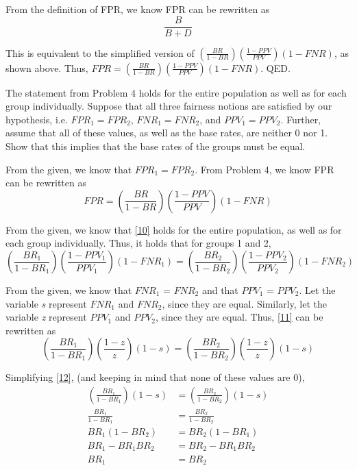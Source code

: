 \documentclass{cisXXX} %
\begin{document}
From the definition of FPR, we know FPR can be rewritten as
$$\frac{B}{B+D}$$

This is equivalent to the simplified version of $(\frac{BR}{1-BR})(\frac{1-PPV}{PPV})(1 -FNR)$, as shown above. Thus, $FPR = (\frac{BR}{1-BR})(\frac{1-PPV}{PPV})(1 -FNR)$. QED.

\HWproblem
The statement from Problem 4 holds for the entire population as well as for each group individually. Suppose that all three fairness notions are satisfied by our hypothesis, i.e. $FPR_1 = FPR_2$, $FNR_1 = FNR_2$, and $PPV_1 = PPV_2$. Further, assume that all of these values, as well as the base rates, are neither 0 nor 1. Show that this implies that the base rates of the groups must be equal.

From the given, we know that $FPR_1  = FPR_2$. From Problem 4, we know FPR can be rewritten as
\begin{equation}
\label{10} FPR = (\frac{BR}{1-BR})(\frac{1-PPV}{PPV})(1 -FNR)
\end{equation}

From the given, we know that \eqref{10} holds for the entire population, as well as for each group individually. Thus, it holds that for groups 1 and 2,
\begin{equation}
\label{11} (\frac{BR_1}{1-BR_1})(\frac{1-PPV_1}{PPV_1})(1 -FNR_1) = (\frac{BR_2}{1-BR_2})(\frac{1-PPV_2}{PPV_2})(1 -FNR_2)
\end{equation}

From the given, we know that $FNR_1$ = $FNR_2$ and that $PPV_1$ = $PPV_2$. Let the variable \textit{s} represent $FNR_1$ and $FNR_2$, since they are equal. Similarly, let the variable \textit{z} represent $PPV_1$ and $PPV_2$, since they are equal. Thus, \eqref{11} can be rewritten as
\begin{equation}
\label{12} (\frac{BR_1}{1-BR_1})(\frac{1-z}{z})(1 -s) = (\frac{BR_2}{1-BR_2})(\frac{1-z}{z})(1 -s)
\end{equation}

Simplifying \eqref{12}, (and keeping in mind that none of these values are 0),
\begin{align*}
(\frac{BR_1}{1-BR_1})(1 -s) &= (\frac{BR_2}{1-BR_2})(1 -s)\\
\frac{BR_1}{1-BR_1} &= \frac{BR_2}{1-BR_2}\\
BR_1(1-BR_2) &= BR_2(1-BR_1)\\
BR_1 - BR_1BR_2 &= BR_2 - BR_1BR_2\\
BR_1 &= BR_2
\end{align*}
\end{document}
